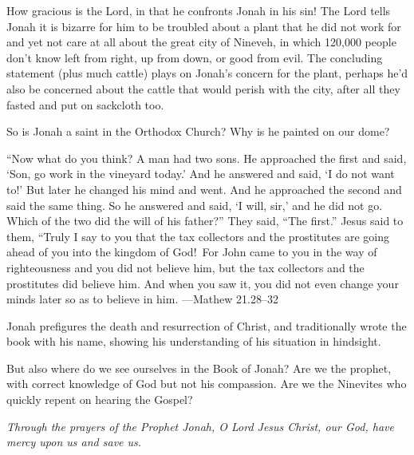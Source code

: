 \documentclass[
]{article}
\newcommand{\RL}[1]{\beginR #1\endR}
\begin{document}
How gracious is the Lord, in that he confronts Jonah in his sin! The
Lord tells Jonah it is bizarre for him to be troubled about a plant that
he did not work for and yet not care at all about the great city of
Nineveh, in which 120,000 people don't know left from right, up from
down, or good from evil. The concluding statement (plus much cattle)
plays on Jonah's concern for the plant, perhaps he'd also be concerned
about the cattle that would perish with the city, after all they fasted
and put on sackcloth too.

So is Jonah a saint in the Orthodox Church? Why is he painted on our
dome?

\RL{``}Now what do you think? A man had two sons. He approached the
first and said, \RL{`}Son, go work in the vineyard today.\RL{'} And he
answered and said, \RL{`}I do not want to!\RL{'} But later he changed
his mind and went. And he approached the second and said the same thing.
So he answered and said, \RL{`}I will, sir,\RL{'} and he did not go.
Which of the two did the will of his father?'' They said, \RL{``}The
first.'' Jesus said to them, \RL{``}Truly I say to you that the tax
collectors and the prostitutes are going ahead of you into the kingdom
of God!~For John came to you in the way of righteousness and you did not
believe him, but the tax collectors and the prostitutes did believe him.
And when you saw it, you did not even change your minds later so as to
believe in him. ---Mathew 21.28--32

Jonah prefigures the death and resurrection of Christ, and traditionally
wrote the book with his name, showing his understanding of his situation
in hindsight.

But also where do we see ourselves in the Book of Jonah? Are we the
prophet, with correct knowledge of God but not his compassion. Are we
the Ninevites who quickly repent on hearing the Gospel?

\emph{Through the prayers of the Prophet Jonah, O Lord Jesus Christ, our
God, have mercy upon us and save us.}
\end{document}

